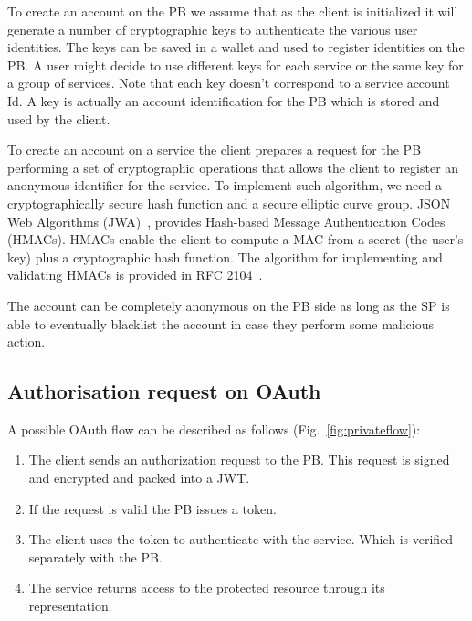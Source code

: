 To create an account on the PB we assume that as the client is initialized it will generate a number of cryptographic keys to authenticate the various user identities. The keys can be saved in a wallet and used to register identities on the PB. A user might decide to use different keys for each service or the same key for a group of services. Note that each key doesn't correspond to a service account Id. A key is actually an account identification for the PB which is stored and used by the client.

To create an account on a service the client prepares a request for the PB performing a set of cryptographic operations that allows the client to register an anonymous identifier for the service. To implement such algorithm, we need a
cryptographically secure hash function and a secure elliptic curve group. JSON Web Algorithms (JWA)~\cite{jones2015jwa}, provides Hash-based Message Authentication Codes (HMACs). HMACs enable the client to compute a MAC from a secret (the user's key) plus a cryptographic hash function. The algorithm for implementing and validating HMACs is provided in RFC 2104~\cite{krawczyk1997rfc}.

The account can be completely anonymous on the PB side as long as the SP is able to eventually blacklist the account in case they perform some malicious action.

\subsection{Authorisation request on OAuth}

A possible OAuth flow can be described as follows (Fig.~\ref{fig:privateflow}):
\begin{enumerate}
    \item The client sends an authorization request to the PB. This request is signed and encrypted and packed into a JWT.
    \item If the request is valid the PB issues a token.
    \item The client uses the token to authenticate with the service. Which is verified separately with the PB.
    \item The service returns access to the protected resource through its representation.
\end{enumerate}

